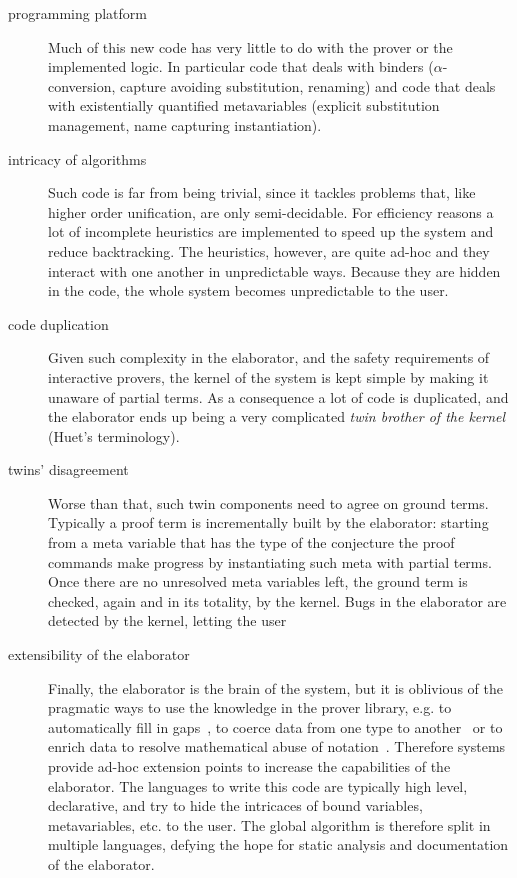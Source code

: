 \documentclass{easychair}
\begin{document}
\begin{description}
\item[programming platform]
Much of this new code has very little to do with the prover or the implemented
logic. In particular code that deals with binders ($\alpha$-conversion,
capture avoiding substitution, renaming) and code that deals with existentially
quantified metavariables (explicit substitution management, name capturing
instantiation).
\item[intricacy of algorithms]
Such code is far from being trivial, since it tackles problems that, like
higher order unification, are only semi-decidable. For efficiency reasons a lot
of incomplete heuristics are implemented to speed up the system and reduce
backtracking. The heuristics, however, are quite ad-hoc and they interact with
one another in unpredictable ways. Because they are hidden in the code, the
whole system becomes unpredictable to the user.
\item[code duplication]
Given such complexity in the elaborator, and the safety requirements of interactive provers, the kernel of the system is kept simple by making it unaware of partial terms.  As a consequence a lot of code is duplicated, and
the elaborator ends up being a very complicated \emph{twin brother of the
kernel} (Huet's terminology).
\item[twins' disagreement]
Worse than that, such twin components need to agree on ground terms.
Typically a proof term is incrementally built by the elaborator:
starting from a meta variable that has the type of
the conjecture the proof commands make progress by instantiating such
meta with partial terms.  Once there are no unresolved meta variables left,
the ground term is checked, again and in its totality, by the kernel.
Bugs in the elaborator are detected by the kernel, letting the user 
\item[extensibility of the elaborator]
Finally, the elaborator is the brain of the system, but it is oblivious of the
pragmatic ways to use the knowledge in the prover library, e.g.  to
automatically fill in gaps~\cite{oothm,unificationhints}, to coerce data from one type
to another~\cite{coercivesubtyping} or to enrich data to resolve mathematical
abuse of notation~\cite{nonuniformcoercions}. Therefore systems provide
ad-hoc extension points to increase the capabilities of the elaborator.  The
languages to write this code are typically high level, declarative, and
try to hide the intricaces of bound variables, metavariables, etc. to the user.
The global algorithm is therefore split in multiple languages, defying the hope
for static analysis and documentation of the elaborator.
\end{description}
\end{document}
